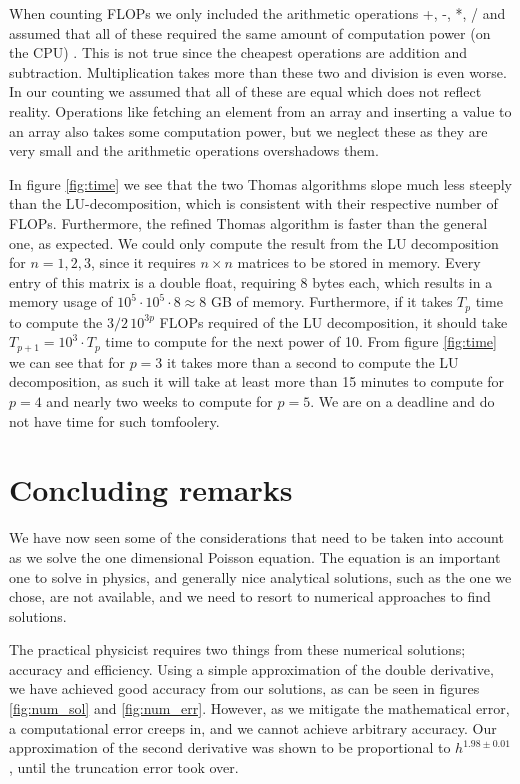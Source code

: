 \documentclass[english]{article}
\begin{document}
When counting FLOPs we only included the arithmetic operations +, -, *, / and assumed that all of these required the same amount of computation power (on the CPU) \autocite{FLOPs}. This is not true since the cheapest operations are addition and subtraction. Multiplication takes more than these two and division  is even worse. In our counting we assumed that all of these are equal which does not reflect reality. Operations like fetching an element from an array and inserting a value to an array also takes some computation power, but we neglect these as they are very small and the arithmetic operations overshadows them.   

In figure \ref{fig:time} we see that the two Thomas algorithms slope much less steeply than the LU-decomposition, which is consistent with their respective number of FLOPs. Furthermore, the refined Thomas algorithm is faster than the general one, as expected. We could only compute the result from the LU decomposition for $n=1,2,3$, since it requires $n\times n$ matrices to be stored in memory. Every entry of this matrix is a double float, requiring 8 bytes each, which results in a memory usage of $10^{5} \cdot 10^{5} \cdot 8 \approx 8$ GB of memory. Furthermore, if it takes $T_p$ time to compute the $3/2 \, 10^{3p}$ FLOPs required of the LU decomposition, it should take $T_{p+1} = 10^3 \cdot T_p$ time to compute for the next power of 10. From figure \ref{fig:time} we can see that for $p=3$ it takes more than a second to compute the LU decomposition, as such it will take at least more than 15 minutes to compute for $p=4$ and nearly two weeks to compute for $p=5$. We are on a deadline and do not have time for such tomfoolery.



\section{Concluding remarks}
We have now seen some of the considerations that need to be taken into account as we solve the one dimensional Poisson equation. The equation is an important one to solve in physics, and generally nice analytical solutions, such as the one we chose, are not available, and we need to resort to numerical approaches to find solutions.

The practical physicist requires two things from these numerical solutions; accuracy and efficiency. Using a simple approximation of the double derivative, we have achieved good accuracy from our solutions, as can be seen in figures \ref{fig:num_sol} and \ref{fig:num_err}. However, as we mitigate the mathematical error, a computational error creeps in, and we cannot achieve arbitrary accuracy. Our approximation of the second derivative was shown to be proportional to $h^{1.98 \pm 0.01}$, until the truncation error took over.
\end{document}

